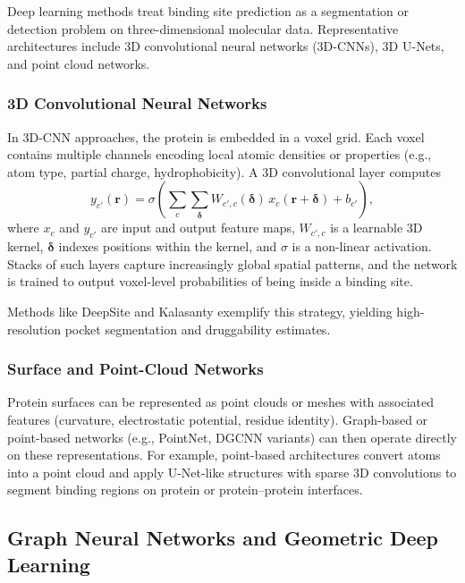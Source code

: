 \documentclass[12pt,a4paper]{article}
\begin{document}
Deep learning methods treat binding site prediction as a segmentation or detection problem on three-dimensional molecular data. Representative architectures include 3D convolutional neural networks (3D-CNNs), 3D U-Nets, and point cloud networks.\cite{CH5_mou2025deep}

\subsubsection{3D Convolutional Neural Networks}

In 3D-CNN approaches, the protein is embedded in a voxel grid. Each voxel contains multiple channels encoding local atomic densities or properties (e.g., atom type, partial charge, hydrophobicity). A 3D convolutional layer computes
\begin{equation}
y_{c'}(\mathbf{r}) = \sigma \left( \sum_{c} \sum_{\boldsymbol{\delta}} W_{c',c}(\boldsymbol{\delta}) \, x_c(\mathbf{r} + \boldsymbol{\delta}) + b_{c'} \right),
\label{eq:3d_conv}
\end{equation}
where \(x_c\) and \(y_{c'}\) are input and output feature maps, \(W_{c',c}\) is a learnable 3D kernel, \(\boldsymbol{\delta}\) indexes positions within the kernel, and \(\sigma\) is a non-linear activation. Stacks of such layers capture increasingly global spatial patterns, and the network is trained to output voxel-level probabilities of being inside a binding site.\cite{CH5_mou2025deep}

Methods like DeepSite and Kalasanty exemplify this strategy, yielding high-resolution pocket segmentation and druggability estimates.\cite{CH5_zhao2020exploring,CH5_mou2025deep}

\subsubsection{Surface and Point-Cloud Networks}

Protein surfaces can be represented as point clouds or meshes with associated features (curvature, electrostatic potential, residue identity). Graph-based or point-based networks (e.g., PointNet, DGCNN variants) can then operate directly on these representations. For example, point-based architectures convert atoms into a point cloud and apply U-Net-like structures with sparse 3D convolutions to segment binding regions on protein or protein–protein interfaces.\cite{CH5_mou2025deep}

\subsection{Graph Neural Networks and Geometric Deep Learning}
\end{document}
